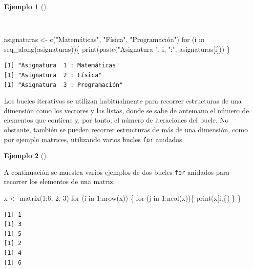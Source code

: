 \documentclass[
  a4paper,
]{scrreport}
\newenvironment{Shaded}{\begin{snugshade}}{\end{snugshade}}
\newcommand{\ControlFlowTok}[1]{\textcolor[rgb]{0.00,0.23,0.31}{#1}}
\newcommand{\DecValTok}[1]{\textcolor[rgb]{0.68,0.00,0.00}{#1}}
\newcommand{\FunctionTok}[1]{\textcolor[rgb]{0.28,0.35,0.67}{#1}}
\newcommand{\NormalTok}[1]{\textcolor[rgb]{0.00,0.23,0.31}{#1}}
\newcommand{\OtherTok}[1]{\textcolor[rgb]{0.00,0.23,0.31}{#1}}
\newcommand{\SpecialCharTok}[1]{\textcolor[rgb]{0.37,0.37,0.37}{#1}}
\newcommand{\StringTok}[1]{\textcolor[rgb]{0.13,0.47,0.30}{#1}}
\theoremstyle{definition}
\theoremstyle{definition}
\newtheorem{example}{Ejemplo}[chapter]
\theoremstyle{remark}
\begin{document}
\begin{example}[]\protect\hypertarget{exm-bucle-iterativo-posicion}{}\label{exm-bucle-iterativo-posicion}

~

\begin{Shaded}
\begin{Highlighting}[]
\NormalTok{asignaturas }\OtherTok{\textless{}{-}} \FunctionTok{c}\NormalTok{(}\StringTok{"Matemáticas"}\NormalTok{, }\StringTok{"Física"}\NormalTok{, }\StringTok{"Programación"}\NormalTok{)}
\ControlFlowTok{for}\NormalTok{ (i }\ControlFlowTok{in} \FunctionTok{seq\_along}\NormalTok{(asignaturas))\{}
  \FunctionTok{print}\NormalTok{(}\FunctionTok{paste}\NormalTok{(}\StringTok{"Asignatura "}\NormalTok{, i, }\StringTok{":"}\NormalTok{, asignaturas[i]))}
\NormalTok{\}}
\end{Highlighting}
\end{Shaded}

\begin{verbatim}
[1] "Asignatura  1 : Matemáticas"
[1] "Asignatura  2 : Física"
[1] "Asignatura  3 : Programación"
\end{verbatim}

\end{example}

Los bucles iterativos se utilizan habitualmente para recorrer
estructuras de una dimensión como los vectores y las listas, donde se
sabe de antemano el número de elementos que contiene y, por tanto, el
número de iteraciones del bucle. No obstante, también se pueden recorrer
estructuras de más de una dimensión, como por ejemplo matrices,
utilizando varios bucles \texttt{for} anidados.

\begin{example}[]\protect\hypertarget{exm-bucles-anidados}{}\label{exm-bucles-anidados}

A continuación se muestra varios ejemplos de dos bucles \texttt{for}
anidados para recorrer los elementos de una matriz.

\begin{Shaded}
\begin{Highlighting}[]
\NormalTok{x }\OtherTok{\textless{}{-}} \FunctionTok{matrix}\NormalTok{(}\DecValTok{1}\SpecialCharTok{:}\DecValTok{6}\NormalTok{, }\DecValTok{2}\NormalTok{, }\DecValTok{3}\NormalTok{)}
\ControlFlowTok{for}\NormalTok{ (i }\ControlFlowTok{in} \DecValTok{1}\SpecialCharTok{:}\FunctionTok{nrow}\NormalTok{(x)) \{}
  \ControlFlowTok{for}\NormalTok{ (j }\ControlFlowTok{in} \DecValTok{1}\SpecialCharTok{:}\FunctionTok{ncol}\NormalTok{(x))\{}
    \FunctionTok{print}\NormalTok{(x[i,j])}
\NormalTok{  \}}
\NormalTok{\}}
\end{Highlighting}
\end{Shaded}

\begin{verbatim}
[1] 1
[1] 3
[1] 5
[1] 2
[1] 4
[1] 6
\end{verbatim}

\end{example}
\end{document}
